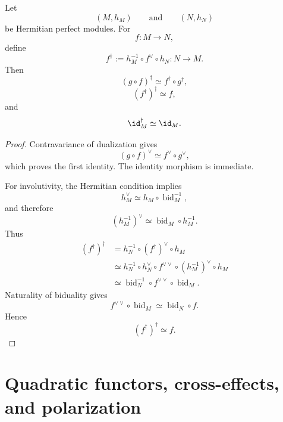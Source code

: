 \begin{proposition}
\label{prop:dagger-on-perfect-modules}
Let
\[
    (M,h_M)
    \qquad\text{and}\qquad
    (N,h_N)
\]
be Hermitian perfect modules. For
\[
    f
    \colon
    M
    \longrightarrow
    N,
\]
define
\[
    f^\dagger
    :=
    h_M^{-1}
    \circ
    f^\vee
    \circ
    h_N
    \colon
    N
    \longrightarrow
    M.
\]
Then
\[
    (g\circ f)^\dagger
    \simeq
    f^\dagger\circ g^\dagger,
\]
\[
    (f^\dagger)^\dagger
    \simeq
    f,
\]
and
\[
    \id_M^\dagger
    \simeq
    \id_M.
\]
\end{proposition}

\begin{proof}
Contravariance of dualization gives
\[
    (g\circ f)^\vee
    \simeq
    f^\vee\circ g^\vee,
\]
which proves the first identity. The identity morphism is immediate.

For involutivity, the Hermitian condition implies
\[
    h_M^\vee
    \simeq
    h_M
    \circ
    \operatorname{bid}_M^{-1},
\]
and therefore
\[
    (h_M^{-1})^\vee
    \simeq
    \operatorname{bid}_M
    \circ
    h_M^{-1}.
\]
Thus
\[
\begin{aligned}
    (f^\dagger)^\dagger
    &=
    h_N^{-1}
    \circ
    (f^\dagger)^\vee
    \circ
    h_M
    \\
    &\simeq
    h_N^{-1}
    \circ
    h_N^\vee
    \circ
    f^{\vee\vee}
    \circ
    (h_M^{-1})^\vee
    \circ
    h_M
    \\
    &\simeq
    \operatorname{bid}_N^{-1}
    \circ
    f^{\vee\vee}
    \circ
    \operatorname{bid}_M.
\end{aligned}
\]
Naturality of biduality gives
\[
    f^{\vee\vee}
    \circ
    \operatorname{bid}_M
    \simeq
    \operatorname{bid}_N
    \circ
    f.
\]
Hence
\[
    (f^\dagger)^\dagger
    \simeq
    f.
\]
\end{proof}

\section{Quadratic functors, cross-effects, and polarization}
\label{sec:quadratic-cross-effects-polarization}

